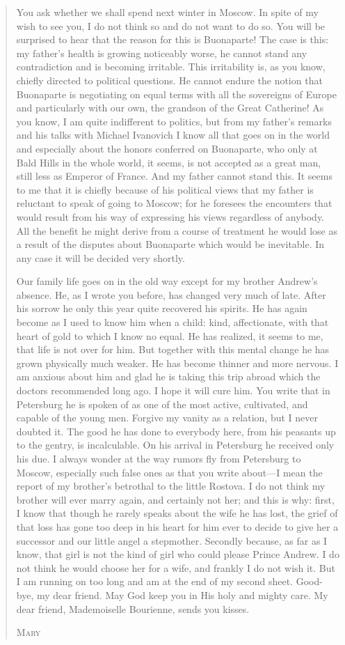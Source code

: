 \begin{quote}
You ask whether we shall spend next winter in Moscow. In spite of
my wish to see you, I do not think so and do not want to do
so. You will be surprised to hear that the reason for this is
Buonaparte! The case is this: my father's health is growing
noticeably worse, he cannot stand any contradiction and is
becoming irritable. This irritability is, as you know, chiefly
directed to political questions. He cannot endure the notion that
Buonaparte is negotiating on equal terms with all the sovereigns
of Europe and particularly with our own, the grandson of the
Great Catherine! As you know, I am quite indifferent to politics,
but from my father's remarks and his talks with Michael Ivanovich
I know all that goes on in the world and especially about the
honors conferred on Buonaparte, who only at Bald Hills in the
whole world, it seems, is not accepted as a great man, still less
as Emperor of France. And my father cannot stand this. It seems
to me that it is chiefly because of his political views that my
father is reluctant to speak of going to Moscow; for he foresees
the encounters that would result from his way of expressing his
views regardless of anybody. All the benefit he might derive from
a course of treatment he would lose as a result of the disputes
about Buonaparte which would be inevitable. In any case it will
be decided very shortly.

Our family life goes on in the old way except for my brother
Andrew's absence. He, as I wrote you before, has changed very
much of late. After his sorrow he only this year quite recovered
his spirits. He has again become as I used to know him when a
child: kind, affectionate, with that heart of gold to which I
know no equal. He has realized, it seems to me, that life is not
over for him. But together with this mental change he has grown
physically much weaker. He has become thinner and more nervous. I
am anxious about him and glad he is taking this trip abroad which
the doctors recommended long ago. I hope it will cure him. You
write that in Petersburg he is spoken of as one of the most
active, cultivated, and capable of the young men. Forgive my
vanity as a relation, but I never doubted it. The good he has
done to everybody here, from his peasants up to the gentry, is
incalculable. On his arrival in Petersburg he received only his
due. I always wonder at the way rumors fly from Petersburg to
Moscow, especially such false ones as that you write about---I
mean the report of my brother's betrothal to the little
Rostova. I do not think my brother will ever marry again, and
certainly not her; and this is why: first, I know that though he
rarely speaks about the wife he has lost, the grief of that loss
has gone too deep in his heart for him ever to decide to give her
a successor and our little angel a stepmother. Secondly because,
as far as I know, that girl is not the kind of girl who could
please Prince Andrew. I do not think he would choose her for a
wife, and frankly I do not wish it. But I am running on too long
and am at the end of my second sheet. Good-bye, my dear
friend. May God keep you in His holy and mighty care. My dear
friend, Mademoiselle Bourienne, sends you kisses.

\textsc{Mary}
\end{quote}

